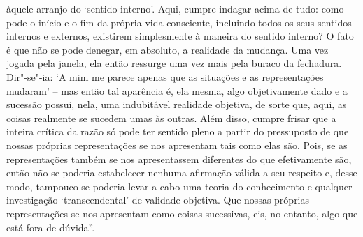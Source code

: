 àquele arranjo do `sentido interno'. Aqui, cumpre indagar acima de
tudo: como pode o início e o fim da própria vida consciente, incluindo
todos os seus sentidos internos e externos, existirem simplesmente à
maneira do sentido interno? O fato é que não se pode denegar, em
absoluto, a realidade da mudança. Uma vez jogada pela janela, ela então
ressurge uma vez mais pela buraco da fechadura. Dir"-se"-ia: `A mim me
parece apenas que as situações e as representações mudaram' -- mas então
tal aparência é, ela mesma, algo objetivamente dado e a sucessão
possui, nela, uma indubitável realidade objetiva, de sorte que, aqui,
as coisas realmente se sucedem umas às outras. Além disso, cumpre frisar
que a inteira crítica da razão só pode ter sentido pleno a partir do
pressuposto de que nossas próprias representações se nos apresentam tais
como elas são. Pois, se as representações também se nos apresentassem
diferentes do que efetivamente são, então não se poderia estabelecer
nenhuma afirmação válida a seu respeito e, desse modo, tampouco se
poderia levar a cabo uma teoria do conhecimento e qualquer investigação
`transcendental' de validade objetiva. Que nossas próprias
representações se nos apresentam como coisas sucessivas, eis, no entanto,
algo que está fora de dúvida''.

